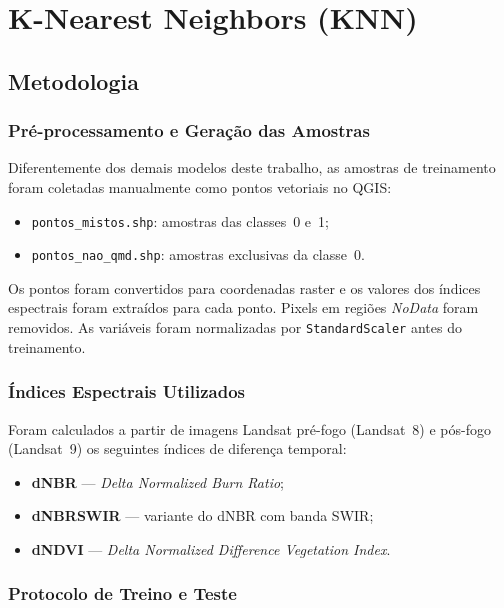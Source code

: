 \documentclass[conference]{IEEEtran}
\begin{document}
\section{K-Nearest Neighbors (KNN)}

\subsection{Metodologia}

\subsubsection{Pré-processamento e Geração das Amostras}

Diferentemente dos demais modelos deste trabalho, as amostras de
treinamento foram coletadas manualmente como pontos vetoriais no QGIS:

\begin{itemize}
  \item \texttt{pontos\_mistos.shp}: amostras das classes~0 e~1;
  \item \texttt{pontos\_nao\_qmd.shp}: amostras exclusivas da classe~0.
\end{itemize}

Os pontos foram convertidos para coordenadas raster e os valores dos
índices espectrais foram extraídos para cada ponto. Pixels em regiões
\textit{NoData} foram removidos. As variáveis foram normalizadas por
\texttt{StandardScaler} antes do treinamento.

\subsubsection{Índices Espectrais Utilizados}

Foram calculados a partir de imagens Landsat pré-fogo (Landsat~8) e
pós-fogo (Landsat~9) os seguintes índices de diferença temporal:

\begin{itemize}
  \item \textbf{dNBR} — \textit{Delta Normalized Burn Ratio};
  \item \textbf{dNBRSWIR} — variante do dNBR com banda SWIR;
  \item \textbf{dNDVI} — \textit{Delta Normalized Difference Vegetation Index}.
\end{itemize}

\subsubsection{Protocolo de Treino e Teste}
\end{document}

